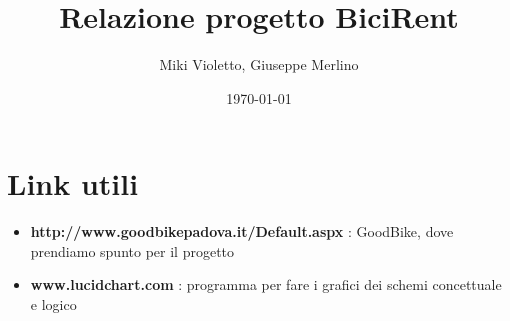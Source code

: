 \documentclass[a4paper,twoside]{article}
\author{Miki Violetto, Giuseppe Merlino}
\title{Relazione progetto BiciRent}
\date{\today}
\begin{document}
\maketitle

\newpage
\tableofcontents

\newpage
\section{Link utili}
\begin{itemize}
\item \textbf{http://www.goodbikepadova.it/Default.aspx} : GoodBike, dove prendiamo spunto per il progetto
\item \textbf{www.lucidchart.com} : programma per fare i grafici dei schemi concettuale e logico
\end{itemize}
\end{document}
